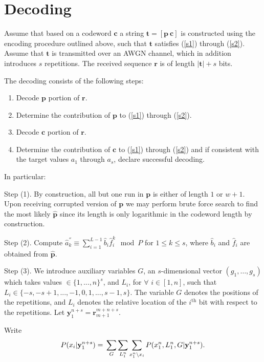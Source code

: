 \section{Decoding}\label{dec}

Assume that based on a codeword $\mathbf{c}$ a string
$\mathbf{t}=[\mathbf{p} ~ \mathbf{c}]$ is constructed using the
encoding procedure outlined above, such that $\mathbf{t}$
satisfies (\ref{s1}) through (\ref{s2}). Assume that $\mathbf{t}$
is transmitted over an AWGN channel, which in addition introduces
$s$ repetitions. The received sequence $\mathbf{r}$ is of length
$|\mathbf{t}|+s$ bits.

The decoding consists of the following steps:
\begin{enumerate}
\item Decode $\mathbf{p}$ portion of $\mathbf{r}$. \item Determine
the contribution of  $\mathbf{p}$ to (\ref{s1}) through
(\ref{s2}). \item Decode $\mathbf{c}$ portion of $\mathbf{r}$.
\item Determine the contribution of  $\mathbf{c}$ to (\ref{s1})
through (\ref{s2}) and if consistent with the target values $a_1$
through $a_s$, declare successful decoding.
\end{enumerate}

In particular:

Step (1). By construction, all but one run in $\mathbf{p}$ is
either of length $1$ or $w+1$. Upon receiving corrupted version of
$\mathbf{p}$ we may perform brute force search to find the most
likely $\mathbf{\hat{p}}$ since its length is only logarithmic in
the codeword length by construction.

Step (2). Compute $\hat{a}^{''}_k \equiv \sum_{i=1}^{L-1}
\hat{b}_i \hat{f}_i^k \mod P$ for $1\leq k \leq s$, where
$\hat{b}_i$ and $\hat{f}_i$ are obtained from $\mathbf{\hat{p}}$.

Step (3). We introduce auxiliary variables $G$, an $s$-dimensional
vector $(g_1,\dots,g_s)$ which takes values $\in \{1,...,n\}^s$,
and $L_i$, for $\forall$ $i \in [1,n]$, such that $L_i \in
\{-s,-s+1,...,-1,0,1,...,s-1,s\}$. The variable $G$ denotes the
positions of the repetitions, and $L_i$ denotes the relative
location of the $i^{\text{th}}$ bit with respect to the
repetitions. Let $\mathbf{y}_1^{n+s}=\mathbf{r}_{m+1}^{m+n+s}$.

Write \begin{equation}\label{marg}P(x_i| \mathbf{y}_1^{n+s}) =\\
\sum_G \sum_{L_1^n} \sum_{x_1^n \backslash x_i} P(x_1^n,L_1^n,G
|\mathbf{y}_1^{n+s}).\end{equation}

